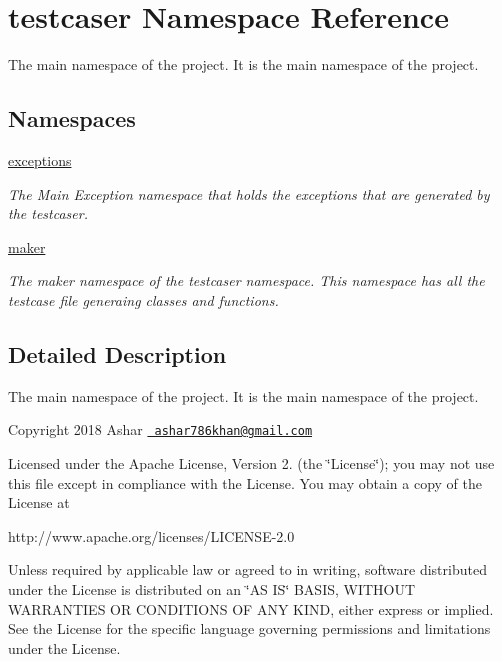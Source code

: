 \hypertarget{namespacetestcaser}{}\section{testcaser Namespace Reference}
\label{namespacetestcaser}


The main namespace of the project. It is the main namespace of the project.  


\subsection*{Namespaces}
\begin{DoxyCompactItemize}
\item 
 \mbox{\hyperlink{namespacetestcaser_1_1exceptions}{exceptions}}
\begin{DoxyCompactList}\small\item\em The Main Exception namespace that holds the exceptions that are generated by the testcaser. \end{DoxyCompactList}\item 
 \mbox{\hyperlink{namespacetestcaser_1_1maker}{maker}}
\begin{DoxyCompactList}\small\item\em The maker namespace of the testcaser namespace. This namespace has all the testcase file generaing classes and functions. \end{DoxyCompactList}\end{DoxyCompactItemize}


\subsection{Detailed Description}
The main namespace of the project. It is the main namespace of the project. 

Copyright 2018 Ashar 
\href{mailto:ashar786khan@gmail.com}{\texttt{ ashar786khan@gmail.\+com}}

Licensed under the Apache License, Version 2. (the \char`\"{}\+License\char`\"{}); you may not use this file except in compliance with the License. You may obtain a copy of the License at \begin{DoxyVerb}http://www.apache.org/licenses/LICENSE-2.0
\end{DoxyVerb}


Unless required by applicable law or agreed to in writing, software distributed under the License is distributed on an \char`\"{}\+A\+S I\+S\char`\"{} B\+A\+S\+IS, W\+I\+T\+H\+O\+UT W\+A\+R\+R\+A\+N\+T\+I\+ES OR C\+O\+N\+D\+I\+T\+I\+O\+NS OF A\+NY K\+I\+ND, either express or implied. See the License for the specific language governing permissions and limitations under the License.